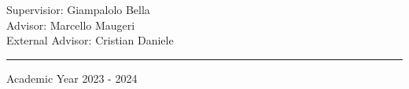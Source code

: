 \begin{titlepage}
\bigskip


\bigskip


\bigskip


\bigskip


\bigskip

{\raggedleft
Supervisior: Giampalolo Bella \\
Advisor: Marcello Maugeri \\
External Advisor: Cristian Daniele
\par}


\bigskip


\bigskip


\bigskip


\bigskip

\hrule

\bigskip

{\centering
Academic Year 2023 - 2024
\par}
\end{titlepage}
